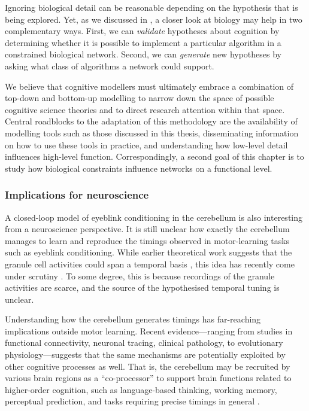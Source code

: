 Ignoring biological detail can be reasonable depending on the hypothesis that is being explored. 
Yet, as we discussed in , a closer look at biology may help in two complementary ways.
First, we can \emph{validate} hypotheses about cognition by determining whether it is possible to implement a particular algorithm in a constrained biological network. 
Second, we can \emph{generate} new hypotheses by asking what class of algorithms a network could support.

We believe that cognitive modellers must ultimately embrace a combination of top-down and bottom-up modelling to narrow down the space of possible cognitive science theories and to direct research attention within that space.
Central roadblocks to the adaptation of this methodology are the availability of modelling tools such as those discussed in this thesis, disseminating information on how to use these tools in practice, and understanding how low-level detail influences high-level function.
Correspondingly, a second goal of this chapter is to study how biological constraints influence \NEF networks on a functional level.

\subsubsection{Implications for neuroscience}
A closed-loop model of eyeblink conditioning in the cerebellum is also interesting from a neuroscience perspective.
It is still unclear how exactly the cerebellum manages to learn and reproduce the timings observed in motor-learning tasks such as eyeblink conditioning.
While earlier theoretical work suggests that the granule cell activities could span a temporal basis \citep{medina2000computer}, this idea has recently come under scrutiny \citep{johansson2014memory}.
To some degree, this is because recordings of the granule activities are scarce, and the source of the hypothesised temporal tuning is unclear.

Understanding how the cerebellum generates timings has far-reaching implications outside motor learning.
Recent evidence---ranging from studies in functional connectivity, neuronal tracing, clinical pathology, to evolutionary physiology---suggests that the same mechanisms are potentially exploited by other cognitive processes as well.
That is, the cerebellum may be recruited by various brain regions as a \enquote{co-processor} to support brain functions related to higher-order cognition, such as language-based thinking, working memory, perceptual prediction, and tasks requiring precise timings in general \citep{sullivan2010cognitive,
           buckner2013cerebellum,
		   oreilly2008cerebellum,
           e2014metaanalysis,
           sanger2020expansion}.

